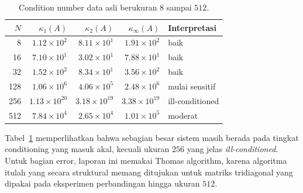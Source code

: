 \documentclass[12pt,a4paper]{article}
\begin{document}
\begin{table}[h]
\centering
\caption{Condition number data asli berukuran $8$ sampai $512$.}
\label{tab:condition-number}
\begin{tabular}{rrrrl}
\toprule
$N$ & $\kappa_1(A)$ & $\kappa_2(A)$ & $\kappa_\infty(A)$ & Interpretasi \\
\midrule
8   & $1.12\times 10^2$  & $8.11\times 10^1$  & $1.91\times 10^2$  & baik \\
16  & $7.10\times 10^1$  & $3.02\times 10^1$  & $7.88\times 10^1$  & baik \\
32  & $1.52\times 10^2$  & $8.34\times 10^1$  & $3.56\times 10^2$  & baik \\
128 & $1.06\times 10^6$  & $4.06\times 10^5$  & $2.48\times 10^6$  & mulai sensitif \\
256 & $1.13\times 10^{20}$ & $3.18\times 10^{19}$ & $3.38\times 10^{19}$ & ill-conditioned \\
512 & $7.84\times 10^4$  & $2.65\times 10^4$  & $1.01\times 10^5$  & moderat \\
\bottomrule
\end{tabular}
\end{table}

Tabel~\ref{tab:condition-number} memperlihatkan bahwa sebagian besar sistem masih berada pada tingkat conditioning yang masuk akal, kecuali ukuran $256$ yang jelas \emph{ill-conditioned}. Untuk bagian error, laporan ini memakai Thomas algorithm, karena algoritma itulah yang secara struktural memang ditujukan untuk matriks tridiagonal yang dipakai pada eksperimen perbandingan hingga ukuran $512$.

\begin{table}[h]
\centering
\caption{Error Thomas algorithm pada matriks tridiagonal sampai ukuran $512$.}
\label{tab:thomas-error}
\end{table}
\end{document}
